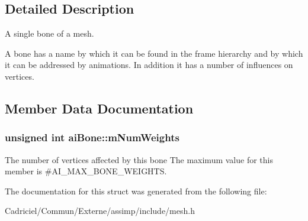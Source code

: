 \subsection{Detailed Description}
A single bone of a mesh. 

A bone has a name by which it can be found in the frame hierarchy and by which it can be addressed by animations. In addition it has a number of influences on vertices. 

\subsection{Member Data Documentation}
\subsubsection[{\texorpdfstring{m\+Num\+Weights}{mNumWeights}}]{\setlength{\rightskip}{0pt plus 5cm}unsigned int ai\+Bone\+::m\+Num\+Weights}\hypertarget{structai_bone_a87a79d42a0132753aac66397ad6f9b71}{}\label{structai_bone_a87a79d42a0132753aac66397ad6f9b71}
The number of vertices affected by this bone The maximum value for this member is \#\+A\+I\+\_\+\+M\+A\+X\+\_\+\+B\+O\+N\+E\+\_\+\+W\+E\+I\+G\+H\+TS. 

The documentation for this struct was generated from the following file\+:\begin{DoxyCompactItemize}
\item 
Cadriciel/\+Commun/\+Externe/assimp/include/mesh.\+h\end{DoxyCompactItemize}
